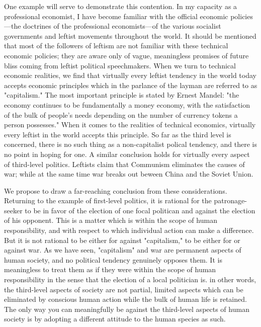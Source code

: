 One example will serve to demonstrate this contention. In my capacity 
as a professional economist, I have become familiar with the official 
economic policies---the doctrines of the professional economists---of the 
various socialist governments and leftist movements throughout the world. It 
should be mentioned that most of the followers of leftism are not familiar 
with these technical economic policies; they are aware only of vague, 
meaningless promises of future bliss coming from leftist political 
speechmakers. When we turn to technical economic realities, we find that 
virtually every leftist tendency in the world today accepts economic 
principles which in the parlance of the layman are referred to as 
"capitalism." The most important principle is stated by Ernest Mandel: "the 
economy continues to be fundamentally a money economy, with the 
satisfaction of the bulk of people's needs depending on the number of 
currency tokens a person possesses." When it comes to the realities of 
technical economics, virtually every leftist in the world accepts this 
principle. So far as the third level is concerned, there is no such thing as a 
non-capitalist polical tendency, and there is no point in hoping for one. A 
similar conclusion holds for virtually every aspect of third-level politics. 
Leftists claim that Communism eliminates the causes of war; while at the 
same time war breaks out beween China and the Soviet Union. 

We propose to draw a far-reaching conclusion from these 
considerations. Returning to the example of first-level politics, it is rational 
for the patronage-seeker to be in favor of the election of one focal politican 
and against the election of his opponent. This is a matter which is within the 
scope of human responsibility, and with respect to which individual action 
can make a difference. But it is not rational to be either for against 
"capitalism," to be either for or against war. As we have seen, "capitalism" 
and war are permanent aspects of human society, and no political tendency 
genuinely opposes them. It is meaningless to treat them as if they were 
within the scope of human responsibility in the sense that the election of a 
local politician is. in other words, the third-level aspects of society are not 
partial, limited aspects which can be eliminated by conscious human action 
while the bulk of human life is retained. The only way you can meaningfully 
be against the third-level aspects of human society is by adopting a different 
attitude to the human species as such. 

